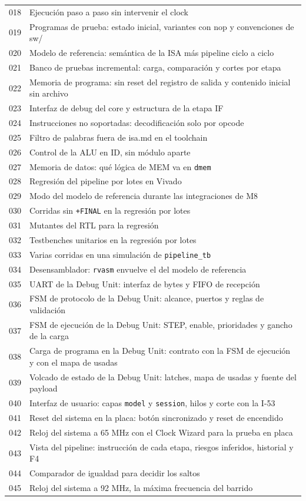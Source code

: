 \begin{longtable}{@{}r p{13.4cm}@{}}
  018 & Ejecución paso a paso sin intervenir el clock \\
  019 & Programas de prueba: estado inicial, variantes con nop y convenciones de sw/ \\
  020 & Modelo de referencia: semántica de la ISA más pipeline ciclo a ciclo \\
  021 & Banco de pruebas incremental: carga, comparación y cortes por etapa \\
  022 & Memoria de programa: sin reset del registro de salida y contenido inicial sin archivo \\
  023 & Interfaz de debug del core y estructura de la etapa IF \\
  024 & Instrucciones no soportadas: decodificación solo por opcode \\
  025 & Filtro de palabras fuera de isa.md en el toolchain \\
  026 & Control de la ALU en ID, sin módulo aparte \\
  027 & Memoria de datos: qué lógica de MEM va en \texttt{dmem} \\
  028 & Regresión del pipeline por lotes en Vivado \\
  029 & Modo del modelo de referencia durante las integraciones de M8 \\
  030 & Corridas sin \texttt{+FINAL} en la regresión por lotes \\
  031 & Mutantes del RTL para la regresión \\
  032 & Testbenches unitarios en la regresión por lotes \\
  033 & Varias corridas en una simulación de \texttt{pipeline\_tb} \\
  034 & Desensamblador: \texttt{rvasm} envuelve el del modelo de referencia \\
  035 & UART de la Debug Unit: interfaz de bytes y FIFO de recepción \\
  036 & FSM de protocolo de la Debug Unit: alcance, puertos y reglas de validación \\
  037 & FSM de ejecución de la Debug Unit: STEP, enable, prioridades y gancho de la carga \\
  038 & Carga de programa en la Debug Unit: contrato con la FSM de ejecución y con el mapa de usadas \\
  039 & Volcado de estado de la Debug Unit: latches, mapa de usadas y fuente del payload \\
  040 & Interfaz de usuario: capas \texttt{model} y \texttt{session}, hilos y corte con la I-53 \\
  041 & Reset del sistema en la placa: botón sincronizado y reset de encendido \\
  042 & Reloj del sistema a 65 MHz con el Clock Wizard para la prueba en placa \\
  043 & Vista del pipeline: instrucción de cada etapa, riesgos inferidos, historial y F4 \\
  044 & Comparador de igualdad para decidir los saltos \\
  045 & Reloj del sistema a 92 MHz, la máxima frecuencia del barrido \\
  \bottomrule
\end{longtable}
